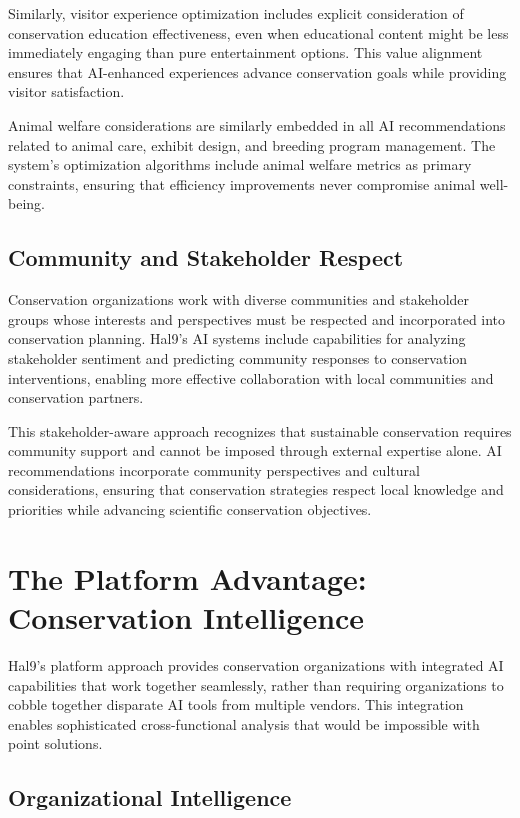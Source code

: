 \documentclass[
  Letterpaper,
]{scrbook}
\begin{document}
Similarly, visitor experience optimization includes explicit
consideration of conservation education effectiveness, even when
educational content might be less immediately engaging than pure
entertainment options. This value alignment ensures that AI-enhanced
experiences advance conservation goals while providing visitor
satisfaction.

Animal welfare considerations are similarly embedded in all AI
recommendations related to animal care, exhibit design, and breeding
program management. The system's optimization algorithms include animal
welfare metrics as primary constraints, ensuring that efficiency
improvements never compromise animal well-being.

\subsection{Community and Stakeholder
Respect}\label{community-and-stakeholder-respect}

Conservation organizations work with diverse communities and stakeholder
groups whose interests and perspectives must be respected and
incorporated into conservation planning. Hal9's AI systems include
capabilities for analyzing stakeholder sentiment and predicting
community responses to conservation interventions, enabling more
effective collaboration with local communities and conservation
partners.

This stakeholder-aware approach recognizes that sustainable conservation
requires community support and cannot be imposed through external
expertise alone. AI recommendations incorporate community perspectives
and cultural considerations, ensuring that conservation strategies
respect local knowledge and priorities while advancing scientific
conservation objectives.

\section{The Platform Advantage: Conservation
Intelligence}\label{the-platform-advantage-conservation-intelligence}

Hal9's platform approach provides conservation organizations with
integrated AI capabilities that work together seamlessly, rather than
requiring organizations to cobble together disparate AI tools from
multiple vendors. This integration enables sophisticated
cross-functional analysis that would be impossible with point solutions.

\subsection{Organizational
Intelligence}\label{organizational-intelligence}
\end{document}

